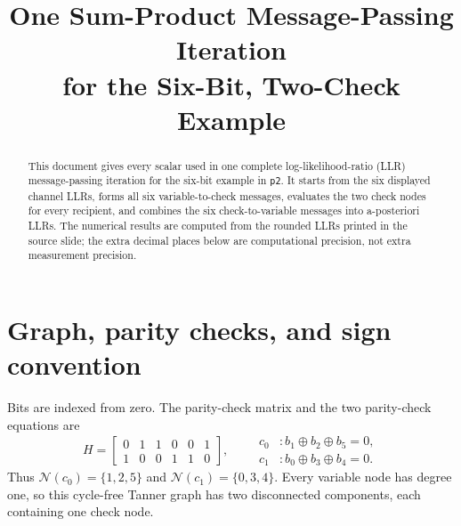 \documentclass[11pt]{article}
\title{One Sum-Product Message-Passing Iteration\\
  for the Six-Bit, Two-Check Example}
\author{}
\date{}
\newcommand{\Ncal}{\mathcal{N}}
\begin{document}
\maketitle
\vspace{-1.5em}

\begin{abstract}
This document gives every scalar used in one complete log-likelihood-ratio
(LLR) message-passing iteration for the six-bit example in \texttt{p2}.
It starts from the six displayed channel LLRs, forms all six
variable-to-check messages, evaluates the two check nodes for every recipient,
and combines the six check-to-variable messages into a-posteriori LLRs.
The numerical results are computed from the rounded LLRs printed in the source
slide; the extra decimal places below are computational precision, not extra
measurement precision.
\end{abstract}

\section{Graph, parity checks, and sign convention}

Bits are indexed from zero.  The parity-check matrix and the two parity-check
equations are
\begin{equation}
H=
\begin{bmatrix}
0&1&1&0&0&1\\
1&0&0&1&1&0
\end{bmatrix},
\qquad
\begin{aligned}
c_0 &: b_1\oplus b_2\oplus b_5=0,\\
c_1 &: b_0\oplus b_3\oplus b_4=0.
\end{aligned}
\label{eq:H}
\end{equation}
Thus \(\Ncal(c_0)=\{1,2,5\}\) and
\(\Ncal(c_1)=\{0,3,4\}\).  Every variable node has degree one, so this
cycle-free Tanner graph has two disconnected components, each containing one
check node.
\end{document}
